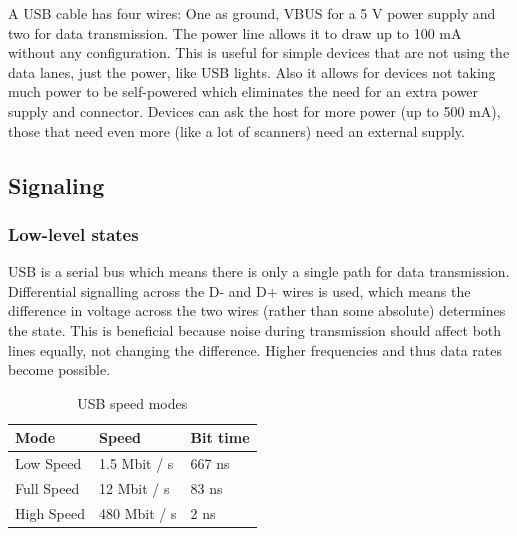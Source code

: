 \documentclass{article}
\begin{document}
A USB cable has four wires: One as ground, VBUS for a 5 V power supply and two for data transmission.
The power line allows it to draw up to 100 mA without any configuration. This is useful for simple
devices that are not using the data lanes, just the power, like USB lights. Also it allows for devices
not taking much power to be self-powered which eliminates the need for an extra power supply and connector.
Devices can ask the host for more power (up to 500 mA), those that need even more (like a lot of scanners) need
an external supply.

\subsection{Signaling}

\subsubsection{Low-level states}

USB is a serial bus which means there is only a single path for data transmission.
Differential signalling across the D- and D+ wires is used, which means the difference in voltage
across the two wires (rather than some absolute) determines the state. This is beneficial because
noise during transmission should affect both lines equally, not changing the difference.
Higher frequencies and thus data rates become possible.

\begin{table}[!htbp]
  \caption{USB speed modes}
  \centering
  \begin{tabular}{l | l | l}
    Mode & Speed & Bit time \\ \hline
    Low Speed & 1.5 Mbit / s & 667 ns \\
    Full Speed & 12 Mbit / s & 83 ns \\
    High Speed & 480 Mbit / s & 2 ns \\
  \end{tabular}
\end{table}
\end{document}
